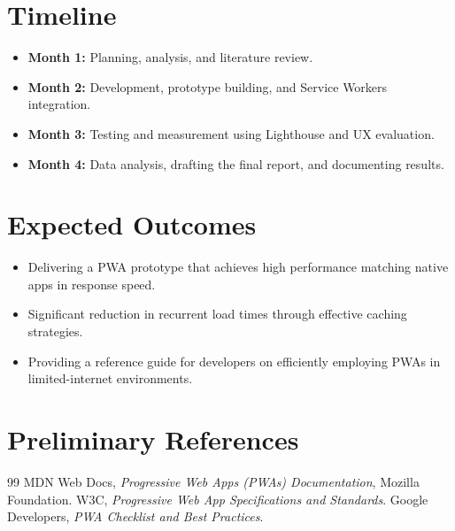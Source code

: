 \documentclass[12pt, a4paper]{article}
\begin{document}
\section{Timeline}
\begin{itemize}
    \item \textbf{Month 1:} Planning, analysis, and literature review.
    \item \textbf{Month 2:} Development, prototype building, and Service Workers integration.
    \item \textbf{Month 3:} Testing and measurement using Lighthouse and UX evaluation.
    \item \textbf{Month 4:} Data analysis, drafting the final report, and documenting results.
\end{itemize}

\section{Expected Outcomes}
\begin{itemize}
    \item Delivering a PWA prototype that achieves high performance matching native apps in response speed.
    \item Significant reduction in recurrent load times through effective caching strategies.
    \item Providing a reference guide for developers on efficiently employing PWAs in limited-internet environments.
\end{itemize}

\section{Preliminary References}
\begin{thebibliography}{99}
     MDN Web Docs, \textit{Progressive Web Apps (PWAs) Documentation}, Mozilla Foundation.
     W3C, \textit{Progressive Web App Specifications and Standards}.
     Google Developers, \textit{PWA Checklist and Best Practices}.
\end{thebibliography}
\end{document}
